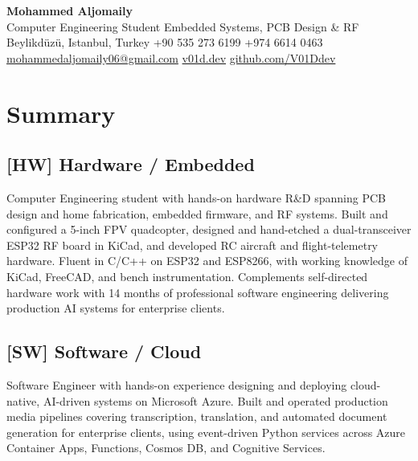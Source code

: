 \documentclass[10pt,a4paper]{article}
\begin{document}
\begin{center}
    {\LARGE \textbf{Mohammed Aljomaily}}\\[5pt]
    Computer Engineering Student \textbar{} Embedded Systems, PCB Design \& RF\\[5pt]
    Beylikd\"uz\"u, Istanbul, Turkey \textbar{} +90 535 273 6199 \textbar{} +974 6614 0463\\[3pt]
    \href{mailto:mohammedaljomaily06@gmail.com}{mohammedaljomaily06@gmail.com} \textbar{} \href{https://v01d.dev}{v01d.dev} \textbar{} \href{https://github.com/V01Ddev}{github.com/V01Ddev}
\end{center}


\section*{Summary}

\subsection*{[HW] Hardware / Embedded}
Computer Engineering student with hands-on hardware R\&D spanning PCB design and
home fabrication, embedded firmware, and RF systems. Built and configured a
5-inch FPV quadcopter, designed and hand-etched a dual-transceiver ESP32 RF board
in KiCad, and developed RC aircraft and flight-telemetry hardware. Fluent in
C/C++ on ESP32 and ESP8266, with working knowledge of KiCad, FreeCAD, and bench
instrumentation. Complements self-directed hardware work with 14 months of
professional software engineering delivering production AI systems for
enterprise clients.

\subsection*{[SW] Software / Cloud}
Software Engineer with hands-on experience designing and deploying cloud-native,
AI-driven systems on Microsoft Azure. Built and operated production media
pipelines covering transcription, translation, and automated document generation
for enterprise clients, using event-driven Python services across Azure Container
Apps, Functions, Cosmos DB, and Cognitive Services.
\end{document}
